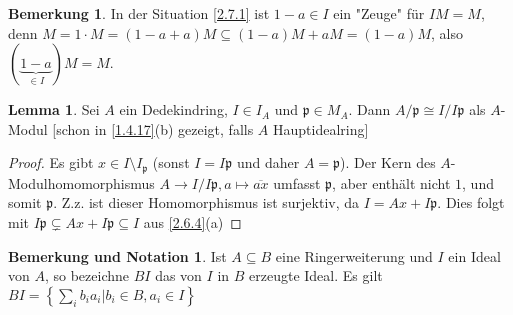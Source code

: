 \documentclass[
twoside=semi,
fontsize=12,
DIV=12, 
cleardoublepage=current,
leqno,
headings=optiontoheadandtoc, 
toc=idx
]{scrbook}
\newcommand{\set}[1]{\left\{ #1 \right\}}
\theoremstyle{definition}
\newtheorem{bemerkung}[definition]{Bemerkung}
\newtheorem{lemma}[definition]{Lemma}
\newtheorem{bem-not}[definition]{Bemerkung und Notation}
\begin{document}
 	\begin{bemerkung}\label{2.7.2}
 		In der Situation \ref{2.7.1} ist $1-a \in I$ ein "Zeuge" f\"ur $IM = M$, denn $M = 1 \cdot M = (1-a+a)M \subseteq (1-a)M + aM = (1-a)M$, also $(\underbrace{1-a}_{\in I})M = M$.
 	\end{bemerkung}
 
 	\begin{lemma}\label{2.7.3}
 		Sei $A$ ein Dedekindring, $I \in I_A$ und $\mathfrak{p} \in M_A$. Dann $A/\mathfrak{p} \cong I / I\mathfrak{p}$ als $A$-Modul [schon in \ref{1.4.17}(b) gezeigt, falls $A$ Hauptidealring]
 		
 		\begin{proof}
 			Es gibt $x \in I \setminus I_\mathfrak{p}$ (sonst $I = I\mathfrak{p}$ und daher $A = \mathfrak{p}$). Der Kern des $A$-Modulhomomorphismus $A\to I/I\mathfrak{p}, a \mapsto \overline{ax}$ umfasst $\mathfrak{p}$, aber enth\"alt nicht $1$, und somit $\mathfrak{p}$. Z.z. ist dieser Homomorphismus ist surjektiv, da $I = Ax + I\mathfrak{p}$. Dies folgt mit $I\mathfrak{p} \subsetneq Ax + I \mathfrak{p} \subseteq I$ aus \ref{2.6.4}(a)
 		\end{proof}
 	\end{lemma}
 
 	\begin{bem-not}\label{2.7.4}
 		Ist $A\subseteq B$ eine Ringerweiterung und $I$ ein Ideal von $A$, so bezeichne $BI$ das von $I$ in $B$ erzeugte Ideal. Es gilt $BI = \set{\sum_i b_ia_i|b_i \in B, a_i \in I}$
 	\end{bem-not}
 	
\end{document}
